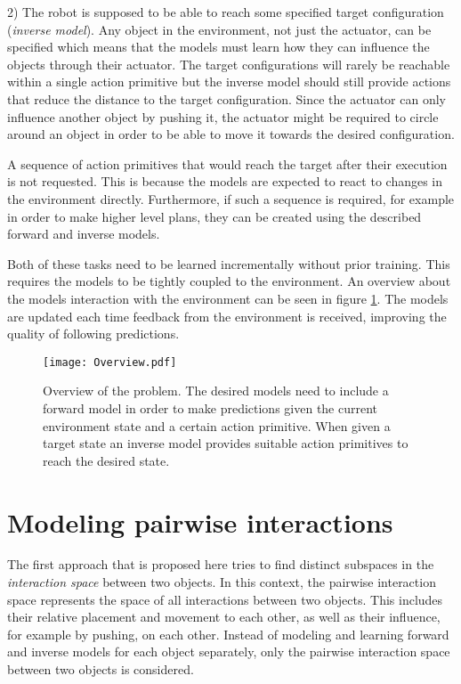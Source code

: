 2) The robot is supposed to be able to reach some specified target configuration (\textit{inverse model}). Any object in the environment, not just the actuator, can be specified which means that the models must learn how they can influence the objects through their actuator. The target configurations will rarely be reachable within a single action primitive but the inverse model should still provide actions that reduce the distance to the target configuration. 
Since the actuator can only influence another object by pushing it, the actuator might be required to circle around an object in order to be able to move it towards the desired configuration.

A sequence of action primitives that would reach the target after their execution is not requested. This is because the models are expected to react to changes in the environment directly. Furthermore, if such a sequence is required, for example in order to make higher level plans, they can be created using the described forward and inverse models.

Both of these tasks need to be learned incrementally without prior training. This requires the models to be tightly coupled to the environment. An overview about the models interaction with the environment can be seen in figure \ref{fig:overview}. The models are updated each time feedback from the environment is received, improving the quality of following predictions.

\begin{figure}
	\centering
	\texttt{[image: Overview.pdf]}
	\caption{Overview of the problem. The desired models need to include a forward model in order to make predictions given the current environment state and a certain action primitive. When given a target state an inverse model provides suitable action primitives to reach the desired state.}
	\label{fig:overview}
\end{figure}

\section{Modeling pairwise interactions \label{sec:pairInt}}

The first approach that is proposed here tries to find distinct subspaces in the \textit{interaction space} between two objects. In this context, the pairwise interaction space represents the space of all interactions between two objects. This includes their relative placement and movement to each other, as well as their influence, for example by pushing, on each other. Instead of modeling and learning forward and inverse models for each object separately, only the pairwise interaction space between two objects is considered. 

